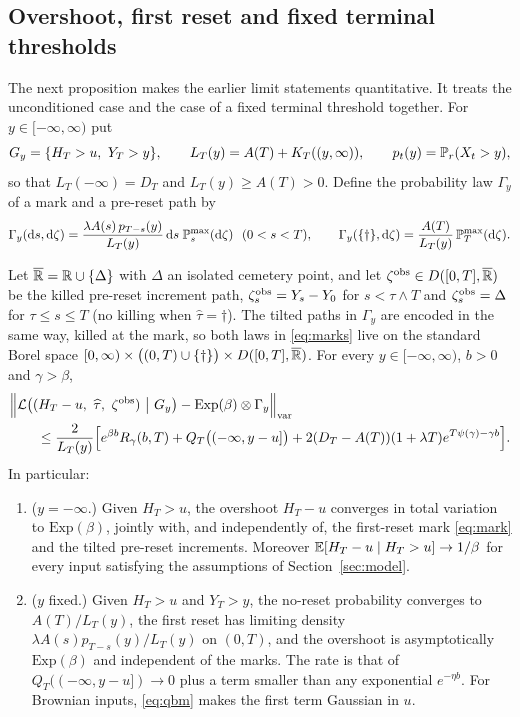 \documentclass[11pt,a4paper]{article}
\begin{document}
\subsection{Overshoot, first reset and fixed terminal thresholds}

The next proposition makes the earlier limit statements quantitative. It treats the unconditioned case and the case of a fixed terminal threshold together. For $y\in[-\infty,\infty)$ put
\[
 G_y=\{H_T>u,\ Y_T>y\},\qquad L_T(y)=A(T)+K_T((y,\infty)),\qquad p_t(y)=\mathbb P_r(X_t>y),
\]
so that $L_T(-\infty)=D_T$ and $L_T(y)\ge A(T)>0$. Define the probability law $\Gamma_y$ of a mark and a pre-reset path by
\[
 \Gamma_y(\mathrm ds,\mathrm d\zeta)=\frac{\lambda A(s)\,p_{T-s}(y)}{L_T(y)}\dd s\;\PP^{\max}_s(\mathrm d\zeta)\ \ (0<s<T),\qquad
 \Gamma_y(\{\dagger\},\mathrm d\zeta)=\frac{A(T)}{L_T(y)}\,\PP^{\max}_T(\mathrm d\zeta).
\]

\begin{proposition}\label{prop:marks}
Let $\overline{\mathbb R}=\mathbb R\cup\{\Delta\}$ with $\Delta$ an isolated cemetery point, and let $\zeta^{\rm obs}\in D([0,T],\overline{\mathbb R})$ be the killed pre-reset increment path, $\zeta^{\rm obs}_s=Y_s-Y_0$ for $s<\tau\wedge T$ and $\zeta^{\rm obs}_s=\Delta$ for $\tau\le s\le T$ (no killing when $\widehat\tau=\dagger$). The tilted paths in $\Gamma_y$ are encoded in the same way, killed at the mark, so both laws in \eqref{eq:marks} live on the standard Borel space $[0,\infty)\times\big((0,T)\cup\{\dagger\}\big)\times D([0,T],\overline{\mathbb R})$. For every $y\in[-\infty,\infty)$, $b>0$ and $\gamma>\beta$,
\begin{equation}\label{eq:marks}
 \begin{split}
 &\Big\|\mathcal L\big((H_T-u,\ \widehat\tau,\ \zeta^{\rm obs})\ \big|\ G_y\big)-\mathrm{Exp}(\beta)\otimes\Gamma_y\Big\|_\var\\
 &\qquad\le\frac{2}{L_T(y)}\Big[e^{\beta b}R_\gamma(b,T)+Q_T\big((-\infty,y-u]\big)+2(D_T-A(T))(1+\lambda T)e^{T\psi(\gamma)-\gamma b}\Big].
 \end{split}
\end{equation}
In particular:
\begin{enumerate}
\item[(i)] ($y=-\infty$.) Given $H_T>u$, the overshoot $H_T-u$ converges in total variation to $\mathrm{Exp}(\beta)$, jointly with, and independently of, the first-reset mark \eqref{eq:mark} and the tilted pre-reset increments. Moreover $\mathbb E[H_T-u\mid H_T>u]\to1/\beta$ for every input satisfying the assumptions of Section~\ref{sec:model}.
\item[(ii)] ($y$ fixed.) Given $H_T>u$ and $Y_T>y$, the no-reset probability converges to $A(T)/L_T(y)$, the first reset has limiting density $\lambda A(s)p_{T-s}(y)/L_T(y)$ on $(0,T)$, and the overshoot is asymptotically $\mathrm{Exp}(\beta)$ and independent of the marks. The rate is that of $Q_T((-\infty,y-u])\to0$ plus a term smaller than any exponential $e^{-\eta b}$. For Brownian inputs, \eqref{eq:qbm} makes the first term Gaussian in $u$.
\end{enumerate}
\end{proposition}
\end{document}
